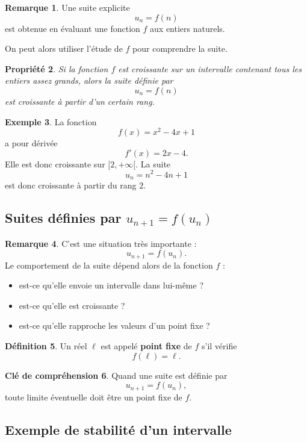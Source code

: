 \documentclass[11pt,a4paper]{article}
\theoremstyle{definition}
\newtheorem{definition}{Définition}[section]
\newtheorem{exemple}[definition]{Exemple}
\newtheorem{remarque}[definition]{Remarque}
\newtheorem{interpretation}[definition]{Clé de compréhension}
\theoremstyle{plain}
\newtheorem{propriete}[definition]{Propriété}
\theoremstyle{remark}
\begin{document}
\begin{remarque}
Une suite explicite
\[
u_n=f(n)
\]
est obtenue en évaluant une fonction $f$ aux entiers naturels.

On peut alors utiliser l'étude de $f$ pour comprendre la suite.
\end{remarque}

\begin{propriete}
Si la fonction $f$ est croissante sur un intervalle contenant tous les entiers assez grands, alors la suite définie par
\[
u_n=f(n)
\]
est croissante à partir d'un certain rang.
\end{propriete}

\begin{exemple}
La fonction
\[
f(x)=x^2-4x+1
\]
a pour dérivée
\[
f'(x)=2x-4.
\]
Elle est donc croissante sur $[2,+\infty[$. La suite
\[
u_n=n^2-4n+1
\]
est donc croissante à partir du rang $2$.
\end{exemple}

\subsection{Suites définies par \(u_{n+1}=f(u_n)\)}

\begin{remarque}
C'est une situation très importante :
\[
u_{n+1}=f(u_n).
\]
Le comportement de la suite dépend alors de la fonction $f$ :
\begin{itemize}[leftmargin=0.8cm]
    \item est-ce qu'elle envoie un intervalle dans lui-même ?
    \item est-ce qu'elle est croissante ?
    \item est-ce qu'elle rapproche les valeurs d'un point fixe ?
\end{itemize}
\end{remarque}

\begin{definition}
Un réel $\ell$ est appelé \textbf{point fixe} de $f$ s'il vérifie
\[
f(\ell)=\ell.
\]
\end{definition}

\begin{interpretation}
Quand une suite est définie par
\[
u_{n+1}=f(u_n),
\]
toute limite éventuelle doit être un point fixe de $f$.
\end{interpretation}

\subsection{Exemple de stabilité d'un intervalle}
\end{document}
